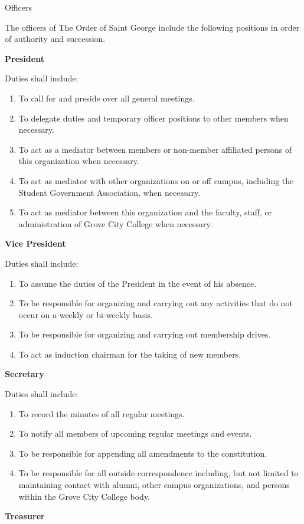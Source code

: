 {
	\begin{article}{Officers}
		\item The officers of The Order of Saint George include the following positions in order of authority and succession.
		
		\item \textbf{President}
		
		Duties shall include:
		\begin{enumerate}
			\item To call for and preside over all general meetings.
			\item To delegate duties and temporary officer positions to other members when necessary.
			\item To act as a mediator between members or non-member affiliated persons of this organization when necessary.
			\item To act as mediator with other organizations on or off campus, including the Student Government Association, when necessary. 
			\item To act as mediator between this organization and the faculty, staff, or administration of Grove City College when necessary.
		\end{enumerate}
		\item \textbf{Vice President}
		
		Duties shall include:
		\begin{enumerate}
			\item To assume the duties of the President in the event of his absence.
			\item To be responsible for organizing and carrying out any activities that do not occur on a weekly or bi-weekly basis.
			\item To be responsible for organizing and carrying out membership drives.
			\item To act as induction chairman for the taking of new members.
		\end{enumerate}
		\item \textbf{Secretary}
		
		Duties shall include:
		\begin{enumerate}
			\item To record the minutes of all regular meetings.
			\item To notify all members of upcoming regular meetings and events.
			\item To be responsible for appending all amendments to the constitution.
			\item To be responsible for all outside correspondence including, but not limited to maintaining contact with alumni, other campus organizations, and persons within the Grove City College body.
		\end{enumerate}
		\item \textbf{Treasurer}
		

\end{article}}
